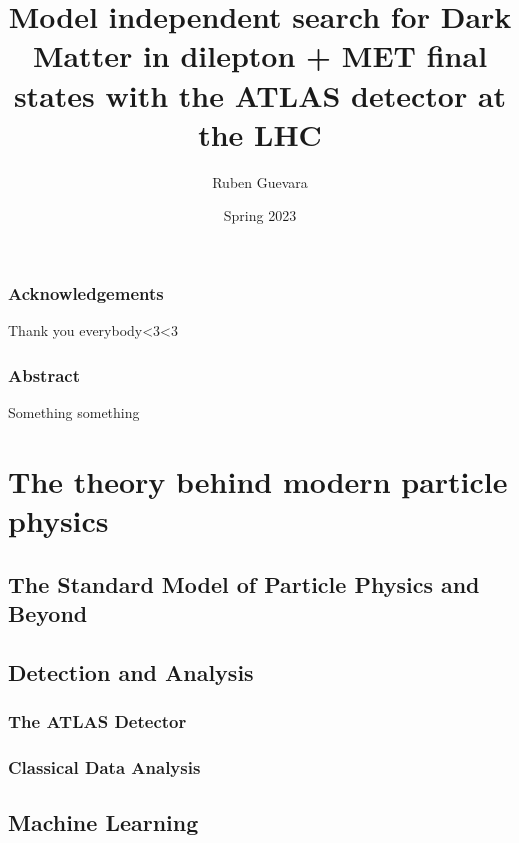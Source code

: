 \documentclass[14pt, a4paper]{book}
\title{Model independent search for Dark Matter
in dilepton + MET final states with the ATLAS detector at the LHC 
}
\author{Ruben Guevara}
\date{Spring 2023}
\begin{document}


\uiomasterfp[
colour = pink,
dept = {Department of Physics},
long,
program = {Physics: Nuclear and Particle Physics},
supervisors = {Professor Farid Ould-Saada \and Dr. Eirik Gramstad}
]
\newpage
\section*{Acknowledgements}
Thank you everybody<3<3

\newpage
\begin{center}
\section*{Abstract}
Something something
\end{center}


\newpage
\tableofcontents
\listoffigures
\listoftables

\newpage
{}
\part{The theory behind modern particle physics}


\chapter{The Standard Model of Particle Physics and Beyond}





\chapter{Detection and Analysis}


\section{The ATLAS Detector}


\section{Classical Data Analysis}



\chapter{Machine Learning}

\end{document}
